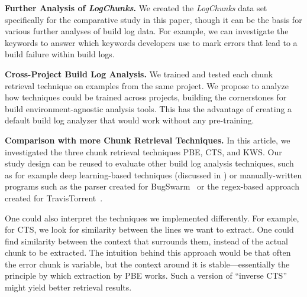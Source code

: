\textbf{Further Analysis of \emph{LogChunks}.}
We created the
\emph{LogChunks} data set \citep{brandt2020logchunks} specifically for
the comparative
study in this paper, though it can be the basis for various further
analyses of build log data.
For example, we can investigate the keywords to answer which
keywords developers use to mark errors that lead to a build failure
within build logs.

\textbf{Cross-Project Build Log Analysis.}
We trained and
tested each chunk retrieval technique on examples from the same
project.
We propose to analyze how techniques could be trained
across projects, building the cornerstones for build
environment-agnostic analysis tools.
This has the advantage of creating
a default build log analyzer that would work without any pre-training.

\textbf{Comparison with more Chunk Retrieval Techniques.}
In this article, we investigated the three chunk retrieval techniques PBE,
CTS, and
KWS\@.
Our study design can be reused to evaluate other build log
analysis techniques, such as for example deep learning-based
techniques (discussed in ) or manually-written
programs such as the parser created for
BugSwarm~\citep{tomassi2019bugswarm} or the regex-based approach
created for TravisTorrent~\citep{beller2017oops}.

One could also interpret the techniques we implemented
differently.
For example, for CTS, we look for similarity between the
lines we want to extract.
One could find similarity between the
context that surrounds them, instead of the actual chunk to be
extracted.
The intuition behind this approach would be that often the
error chunk is variable, but the context around it is
stable---essentially the principle by which extraction by PBE
works.
Such a version of ``inverse CTS'' might yield better retrieval
results.

